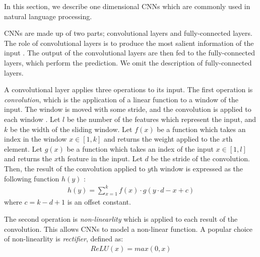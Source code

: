 In this section, we describe one dimensional CNNs which are commonly used in natural language processing\citep{collobert2008unified, collobert2011natural, kalchbrenner2014convolutional, zhang2015character, goldberg2016primer}.

CNNs are made up of two parts; convolutional layers and fully-connected layers.
The role of convolutional layers is to produce the most salient information of the input \citep{goldberg2016primer}.
The output of the convolutional layers are then fed to the fully-connected layers, which perform the prediction.
We omit the description of fully-connected layers.

A convolutional layer applies three operations to its input.
The first operation is \emph{convolution}, which is the application of a linear function to a window of the input. 
The window is moved with some stride, and the convolution is applied to each window \citep{goldberg2016primer}.
%
Let $l$ be the number of the features which represent the input, and $k$ be the width of the sliding window.
Let $f(x)$ be a function which takes an index in the window $x \in [1, k]$ and returns the weight applied to the $x$th element.
Let $g(x)$ be a function which takes an index of the input $x \in [1, l]$ and returns the $x$th feature in the input.
Let $d$ be the stride of the convolution.
Then, the result of the convolution applied to $y$th window is expressed as the following function $h(y)$ \citep{zhang2015character}:
\begin{align*}
h(y) = \sum_{x=1}^{k} f(x) \cdot g(y \cdot d - x + c)
\end{align*}
where $c = k - d + 1$ is an offset constant.

The second operation is \emph{non-linearlity} which is applied to each result of the convolution.
This allows CNNs to model a non-linear function.
A popular choice of non-linearlity is \emph{rectifier}, defined as:
\begin{align*}
ReLU(x) = max(0, x)
\end{align*}

